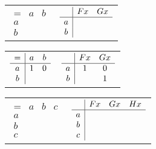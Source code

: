 \documentclass[PHIL101-Textbook.tex]{subfiles}
\begin{document}
\begin{earg}
\item \begin{tabular}{ll}
	$\begin{array}{c|cc}
	   = & a & b\\ \hline
	   a &&\\
	   b &&
	 \end{array}$
		 & 
		   $\begin{array}{c|cc}
			  & \mathord{F}{x} & \mathord{G}{x} \\ \hline
			  a &  & \\
			  b & &
			\end{array}$
	 \end{tabular}\medskip\medskip
\item \begin{tabular}{ll}
	$\begin{array}{c|cc}
	   = & a & b\\ \hline
	   a &1&0\\
	   b & &
	 \end{array}$
		 & 
	$\begin{array}{c|cc}
	   & \mathord{F}{x} & \mathord{G}{x} \\ \hline
	   a & 1 & 0\\
	   b & &1
	 \end{array}$
  \end{tabular}\medskip\medskip
\item  \begin{tabular}{ll}
	$\begin{array}{c|ccc}
	   = & a & b & c\\ \hline
	   a & &\\
	   b & & \\
	   c
	 \end{array}$
		 & 
	$\begin{array}{c|ccc}
	   & \mathord{F}{x} & \mathord{G}{x} & \mathord{H}{x}\\ \hline
	   a & & \\
	   b & &\\
	   c & &
	 \end{array}$
  \end{tabular}\medskip\medskip
  

\end{earg}
\end{document}
